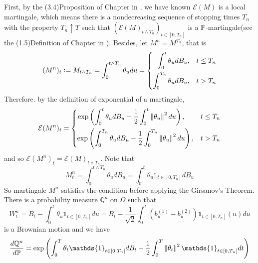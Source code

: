 \documentclass[a4paper,12pt]{article}
\begin{document}
\begin{enumerate}[label=(\arabic*)]
\begin{rmk}
    \noindent First, by the (3.4)Proposition of Chapter   in \cite{revuz2013continuous}, we have known $\mathcal{E}(M)$ is a local martingale, which means there is a nondecreasing sequence of stopping times $T_n$ with the property $T_n \uparrow T$ such that $(\mathcal{E}(M)_{t \wedge T_n})_{t \in [0,T_n]}$ is a $\mathbb{P}$-martingale(see the (1.5)Definition of Chapter   in \cite{revuz2013continuous}). Besides, let $M^n = M^{T_n}$, that is
    \begin{equation*}
      (M^n)_t \vcentcolon= M_{t \wedge T_n} = \int_0^{t \wedge T_n} \theta_u du = \left\{
        \begin{aligned}
          \int_0^{t} \theta_u dB_u,&\quad t \leq T_n \\
          \int_0^{T_n} \theta_u dB_u,&\quad t > T_n
        \end{aligned}
      \right.
    \end{equation*}
    Therefore. by the definition of exponential of a martingale,
    \begin{equation*}
      \mathcal{E}(M^n)_t = \left\{
        \begin{aligned}
          \exp\left(\int_0^{t} \theta_u dB_u - \frac{1}{2}\int_0^{t} \left\lVert\theta_u\right\lVert^2 du\right),\quad~&\quad t \leq T_n \\
          \exp\left(\int_0^{T_n} \theta_u dB_u - \frac{1}{2}\int_0^{T_n} \left\lVert\theta_u\right\lVert^2 du\right),&\quad t > T_n \\
        \end{aligned}
      \right.
    \end{equation*}
    and so $\mathcal{E}(M^n)_t = \mathcal{E}(M)_{t\wedge T_n}$. Note that
    \begin{equation*}
      M^n_t = \int_0^{t \wedge T_n} \theta_u dB_u =  \int_0^{t} \theta_u \mathds{1}_{t \in [0,T_n]} dB_u
    \end{equation*}
    So martingale $M^n$ satisfies the condition before applying the Girsanov's Theorem. There is a probability measure $\mathbb{Q}^n$ on $\Omega$ such that 
    \begin{equation*}
      W^n_t = B_t - \int_0^t\theta_u \mathds{1}_{t \in [0,T_n]} du =  B_t - \frac{1}{\sqrt{2}}\int_0^t\left(b_u^{(1)}-b_u^{(2)}\right) \mathds{1}_{t \in [0,T_n]}(u) du
    \end{equation*}
    is a Brownian motion and we have
    \begin{equation*}
      \begin{aligned}
        \frac{d\mathbb{Q}^n}{d\Pb} &= \exp \left(\int_0^T \theta_t \mathds{1}_{t \in [0,T_n]}d B_t-\frac{1}{2} \int_0^T \norm{\theta_t}^2 \mathds{1}_{t \in [0,T_n]}d t\right) \\

\end{aligned}
\end{equation*}
\end{rmk}
\end{enumerate}
\end{document}
